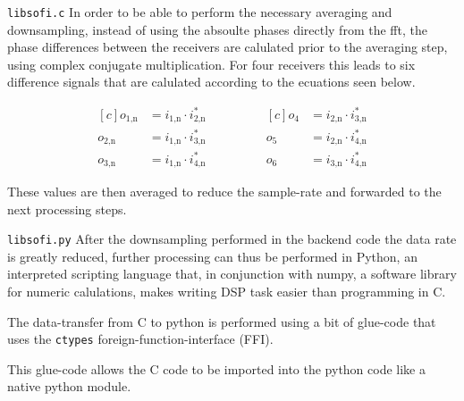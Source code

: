 \begin{subchapter}{\texttt{libsofi.c}}
  In order to be able to perform the necessary averaging
  and downsampling, instead of using the absoulte phases
  directly from the fft, the phase differences between the receivers
  are calulated prior to the averaging step, using complex conjugate multiplication.
  For four receivers this leads to six difference signals
  that are calulated according to the ecuations seen below.

  \begin{equation*}
    \begin{aligned}[c]
      o_\text{1,n}&= i_\text{1,n} \cdot i_\text{2,n}^{\ast} \\
      o_\text{2,n}&= i_\text{1,n} \cdot i_\text{3,n}^{\ast} \\
      o_\text{3,n}&= i_\text{1,n} \cdot i_\text{4,n}^{\ast}
    \end{aligned}
    \qquad \qquad
    \begin{aligned}[c]
      o_\text{4}&= i_\text{2,n} \cdot i_\text{3,n}^{\ast} \\
      o_\text{5}&= i_\text{2,n} \cdot i_\text{4,n}^{\ast} \\
      o_\text{6}&= i_\text{3,n} \cdot i_\text{4,n}^{\ast}
    \end{aligned}
  \end{equation*}

  These values are then averaged to reduce the sample-rate
  and forwarded to the next processing steps.
\end{subchapter}

\begin{subchapter}{\texttt{libsofi.py}}
  After the downsampling performed in the backend code
  the data rate is greatly reduced, further processing
  can thus be performed in Python, an interpreted scripting
  language that, in conjunction with numpy, a software library for
  numeric calulations, makes writing DSP task easier
  than programming in C.

  The data-transfer from C to python is performed using
  a bit of glue-code that uses the \texttt{ctypes}
  foreign-function-interface (FFI).

  This glue-code allows the C code to be imported
  into the python code like a native python module.
\end{subchapter}


